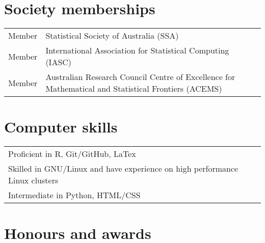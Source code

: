 \documentclass[10pt,a4paper,]{article}
\begin{document}
\hypertarget{society-memberships}{%
\section{Society memberships}\label{society-memberships}}

\begin{tabular}{ll}
  Member & Statistical Society of Australia (SSA) \\ 
  Member & International Association for Statistical Computing (IASC) \\ 
  Member & Australian Research Council Centre of Excellence for Mathematical and Statistical Frontiers (ACEMS) \\ 
  \end{tabular}

\hypertarget{computer-skills}{%
\section{Computer skills}\label{computer-skills}}

\begin{tabular}{l}
  Proficient in R, Git/GitHub, LaTex \\ 
  Skilled in GNU/Linux and have experience on high performance Linux clusters \\ 
  Intermediate in Python, HTML/CSS \\ 
  \end{tabular}

\hypertarget{honours-and-awards}{%
\section{Honours and awards}\label{honours-and-awards}}
\end{document}
